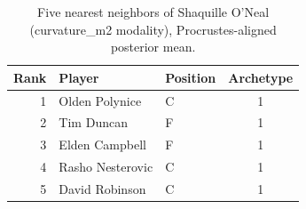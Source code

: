 \begin{table}[htbp]
  \centering\small
  \begin{tabular}{rllc}
    \toprule
    Rank & Player & Position & Archetype \\
    \midrule
    1 & Olden Polynice & C & 1 \\
    2 & Tim Duncan & F & 1 \\
    3 & Elden Campbell & F & 1 \\
    4 & Rasho Nesterovic & C & 1 \\
    5 & David Robinson & C & 1 \\
    \bottomrule
  \end{tabular}
  \caption{Five nearest neighbors of Shaquille O'Neal (curvature_m2 modality), Procrustes-aligned posterior mean.}
  \label{tab:Shaquille_O_Neal_neighbors_curvature_m2}
\end{table}

